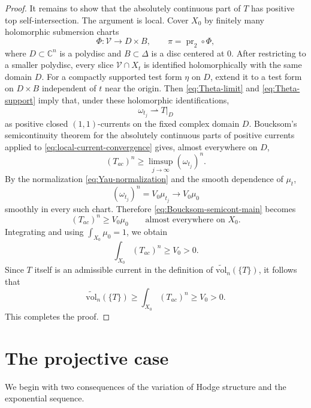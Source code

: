 \documentclass[11pt,letterpaper]{amsart}
\numberwithin{equation}{section}
\newcommand{\CC}{\mathbb{C}}
\begin{document}
\begin{proof}
It remains to show that the absolutely continuous part of $T$ has positive top self-intersection. The argument is local. Cover $X_0$ by finitely many
holomorphic submersion charts
\[
 \Phi:\mathcal V\longrightarrow D\times B,
 \qquad \pi=\operatorname{pr}_2\circ\Phi,
\]
where $D\subset\CC^n$ is a polydisc and $B\subset\Delta$ is a disc centered at $0$. After restricting to a smaller polydisc, every slice
$\mathcal V\cap X_t$ is identified holomorphically with the same domain $D$.
For a compactly supported test form $\eta$ on $D$, extend it to a test form on
$D\times B$ independent of $t$ near the origin. Then
\eqref{eq:Theta-limit} and \eqref{eq:Theta-support} imply that, under these
holomorphic identifications,
\begin{equation}\label{eq:local-current-convergence}
 \omega_{t_j}\rightharpoonup T|_D
\end{equation}
as positive closed $(1,1)$-currents on the fixed complex domain $D$.
Boucksom's semicontinuity theorem for the absolutely continuous parts of
positive currents \cite[Proposition 2.1]{Bou} applied to
\eqref{eq:local-current-convergence} gives, almost everywhere on $D$,
\begin{equation}\label{eq:Boucksom-semicont-main}
 (T_{ac})^n
 \ge \limsup_{j\to\infty}(\omega_{t_j})^n.
\end{equation}
By the normalization \eqref{eq:Yau-normalization} and the smooth dependence of
$\mu_t$,
\[
 (\omega_{t_j})^n=V_0\mu_{t_j}\longrightarrow V_0\mu_0
\]
smoothly in every such chart. Therefore \eqref{eq:Boucksom-semicont-main}
becomes
\begin{equation}\label{eq:positive-ac-density}
 (T_{ac})^n\ge V_0\mu_0\qquad\text{almost everywhere on }X_0.
\end{equation}
Integrating and using $\int_{X_0}\mu_0=1$, we obtain
\[
 \int_{X_0}(T_{ac})^n\ge V_0>0.
\]
Since $T$ itself is an admissible current in the definition of
$\widetilde{\mathrm{vol}}_n(\{T\})$, it follows that
\[
 \widetilde{\mathrm{vol}}_n(\{T\})
 \ge\int_{X_0}(T_{ac})^n
 \ge V_0>0.
\]
This completes the proof.
\end{proof}


\section{The projective case}

We begin with two consequences of the variation of Hodge structure and the exponential sequence.
\end{document}
